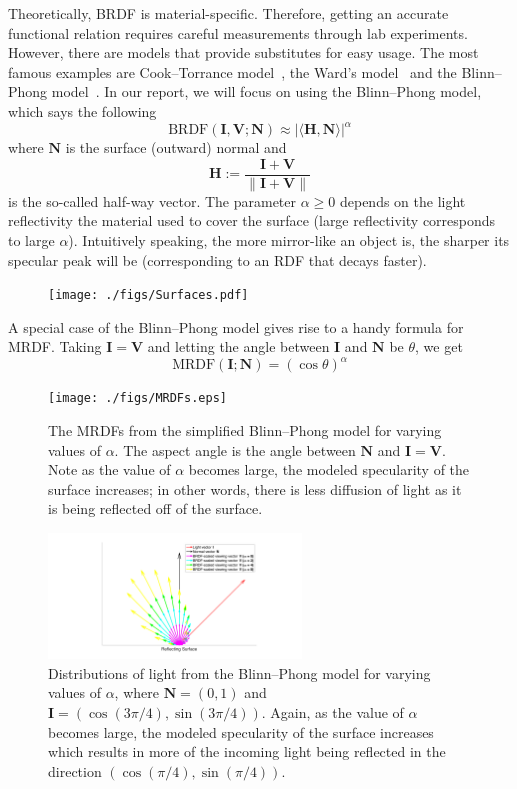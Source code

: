 \documentclass[11pt,reqno]{amsart}
\newcommand{\BRDF}{\mathrm{BRDF}}
\newcommand{\MRDF}{\mathrm{MRDF}}
\newcommand{\ip}[2]{\langle {#1}, {#2} \rangle}
\theoremstyle{definition}
\begin{document}
Theoretically, BRDF is material-specific. Therefore, getting an accurate functional
relation requires careful measurements through lab experiments. However, there
are models that provide substitutes for easy usage. The most famous examples
are Cook--Torrance model~\cite{CookTorr}, the Ward's model~\cite{Ward} and the
Blinn--Phong model~\cite{BlinnPhong}. In our report, we will focus on using the
Blinn--Phong model, which says the following
\[
   \BRDF(\mathbf{I},\mathbf{V};\mathbf{N})
   \approx
   |\ip{\mathbf{H}}{\mathbf{N}}|^\alpha
\]
where $\mathbf{N}$ is the surface (outward) normal and $$\mathbf{H}:=\frac{\mathbf{I}+\mathbf{V}} {\|\mathbf{I}+\mathbf{V}\|}$$
is the so-called half-way vector. The parameter $\alpha \geq 0$ depends on the light reflectivity the material used to cover the surface (large reflectivity corresponds to large $\alpha$). Intuitively speaking, the more mirror-like an object is,  the sharper its specular peak will be (corresponding to an RDF that decays faster). 

\begin{figure}[H]
 \texttt{[image: ./figs/Surfaces.pdf]}
\end{figure}

A special case of the Blinn--Phong model gives rise to a handy formula for MRDF. Taking $\mathbf{I}=\mathbf{V}$ and letting the angle between $\mathbf{I}$ and $\mathbf{N}$ be $\theta$, we get
\[
\MRDF(\mathbf{I};\mathbf{N})=(\cos \theta)^\alpha
\]

\begin{figure}
 \texttt{[image: ./figs/MRDFs.eps]}
 \caption{The MRDFs from the simplified Blinn--Phong model for varying values of $\alpha$. The aspect angle is the angle between $\mathbf{N}$ and $\mathbf{I}=\mathbf{V}$. Note as the value of $\alpha$ becomes large, the modeled specularity of the surface increases; in other words, there is less diffusion of light as it is being reflected off of the surface.}
 \label{MRDFs}
\end{figure}

\begin{figure}
 \includegraphics[width=0.6\textwidth]{./figs/BRDF_Vectors.pdf}
 \caption{Distributions of light from the Blinn--Phong model for varying values of $\alpha$, where $\mathbf{N} = (0,1)$ and $\mathbf{I} = (\cos(3\pi/4),\sin(3\pi/4))$. Again, as the value of $\alpha$ becomes large, the modeled specularity of the surface increases which results in more of the incoming light being reflected in the direction $(\cos(\pi/4),\sin(\pi/4))$.}
 \label{BRDFVectors}
\end{figure}
\end{document}
